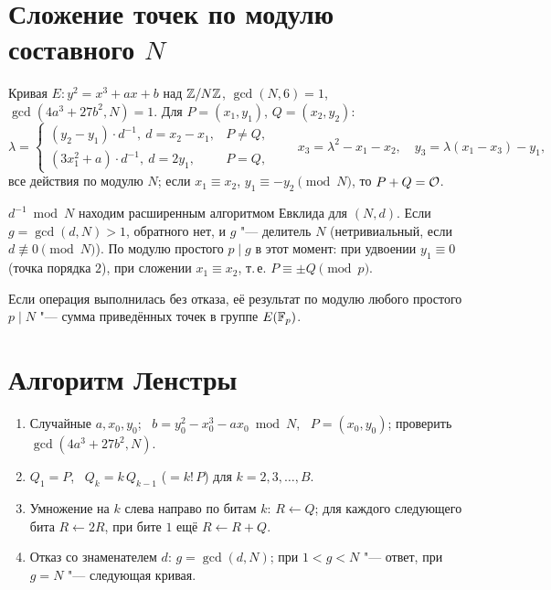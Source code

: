 \documentclass{ca-handout}
\begin{document}
\makehandouttitle

\section{Сложение точек по модулю составного \texorpdfstring{$N$}{N}}
Кривая $E\colon y^2 = x^3 + ax + b$ над $\mathbb{Z}/N\mathbb{Z}$, $\gcd(N, 6) = 1$,
$\gcd(4a^3 + 27b^2, N) = 1$. Для $P = (x_1, y_1)$, $Q = (x_2, y_2)$:
\[
  \lambda = \begin{cases}
    (y_2 - y_1)\cdot d^{-1}, \ d = x_2 - x_1, & P \ne Q,\\
    (3x_1^2 + a)\cdot d^{-1}, \ d = 2y_1, & P = Q,
  \end{cases}
  \qquad x_3 = \lambda^2 - x_1 - x_2, \quad y_3 = \lambda(x_1 - x_3) - y_1,
\]
все действия по модулю $N$; если $x_1 \equiv x_2$, $y_1 \equiv -y_2 \pmod N$, то
$P + Q = \mathcal{O}$.

\begin{reminder}[title={Отказ = делитель}]
$d^{-1} \bmod N$ находим расширенным алгоритмом Евклида для $(N, d)$. Если $g = \gcd(d, N) > 1$,
обратного нет, и $g$ "--- делитель $N$ (нетривиальный, если $d \not\equiv 0 \pmod N$).
По модулю простого $p \mid g$ в этот момент: при удвоении $y_1 \equiv 0$ (точка порядка $2$),
при сложении $x_1 \equiv x_2$, т.\,е. $P \equiv \pm Q \pmod p$.
\end{reminder}

Если операция выполнилась без отказа, её результат по модулю любого простого $p \mid N$ "---
сумма приведённых точек в группе $E(\mathbb{F}_p)$.

\section{Алгоритм Ленстры}
\begin{reminder}[title={Одна кривая}]
\begin{enumerate}
  \item Случайные $a, x_0, y_0$; \ $b = y_0^2 - x_0^3 - a x_0 \bmod N$, \ $P = (x_0, y_0)$;
    проверить $\gcd(4a^3 + 27b^2, N)$.
  \item $Q_1 = P$, \ $Q_k = k\,Q_{k-1}$ ($= k!\,P$) для $k = 2, 3, \dots, B$.
  \item Умножение на $k$ слева направо по битам $k$: $R \gets Q$; для каждого следующего бита
    $R \gets 2R$, при бите $1$ ещё $R \gets R + Q$.
  \item Отказ со знаменателем $d$: $g = \gcd(d, N)$; при $1 < g < N$ "--- ответ, при $g = N$
    "--- следующая кривая.
\end{enumerate}
\end{reminder}
\end{document}
